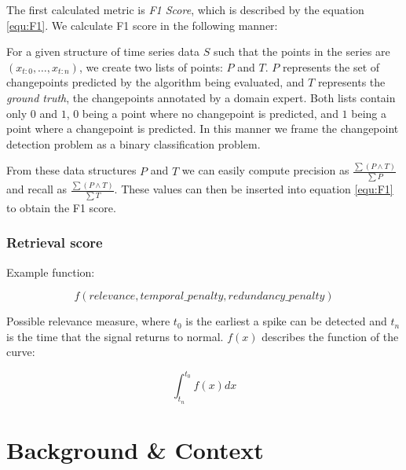\documentclass{uvamscse}	%
\begin{document}
The first calculated metric is \emph{F1 Score}, which is described by the equation \ref{equ:F1}. We calculate F1 score in the following manner:

For a given structure of time series data $S$ such that the points in the series are $(x_{t:0},\ldots,x_{t:n})$, we create two lists of points: $P$ and $T$. $P$ represents the set of changepoints predicted by the algorithm being evaluated, and $T$ represents the \emph{ground truth}, the changepoints annotated by a domain expert. Both lists contain only $0$ and $1$, $0$ being a point where no changepoint is predicted, and $1$ being a point where a changepoint is predicted. In this manner we frame the changepoint detection problem as a binary classification problem.

From these data structures $P$ and $T$ we can easily compute precision as $\frac{\sum (P \wedge T) }{\sum P}$ and recall as $\frac{\sum (P \wedge T)}{\sum T}$. These values can then be inserted into equation \ref{equ:F1} to obtain the F1 score.

\subsection{Retrieval score}

Example function:

\begin{equation}
	f(relevance, temporal\_penalty, redundancy\_penalty)
\end{equation}


Possible relevance measure, where $t_0$ is the earliest a spike can be detected and $t_n$ is the time that the signal returns to normal. $f(x)$ describes the function of the curve:

\begin{equation}
	\int^{t_0}_{t_n} f(x) dx
\end{equation}

\chapter{Background \& Context}

\end{document}
